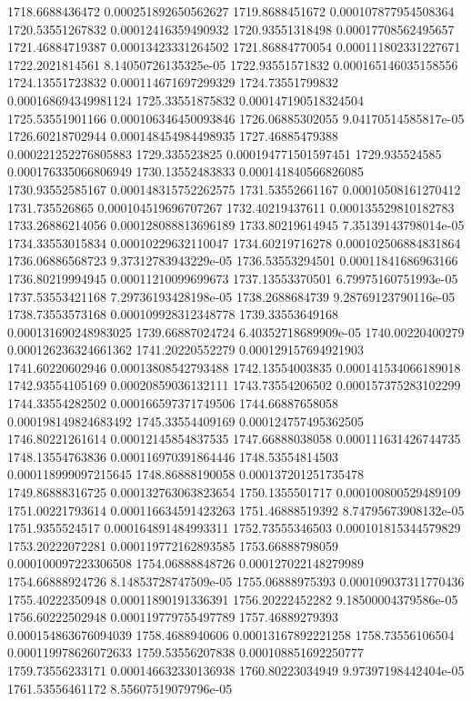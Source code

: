 {1718.6688436472 0.000251892650562627
1719.8688451672 0.000107877954508364
1720.53551267832 0.00012416359490932
1720.93551318498 0.00017708562495657
1721.46884719387 0.00013423331264502
1721.86884770054 0.000111802331227671
1722.2021814561 8.14050726135325e-05
1722.93551571832 0.000165146035158556
1724.13551723832 0.000114671697299329
1724.73551799832 0.000168694349981124
1725.33551875832 0.000147190518324504
1725.53551901166 0.000106346450093846
1726.06885302055 9.04170514585817e-05
1726.60218702944 0.000148454984498935
1727.46885479388 0.000221252276805883
1729.335523825 0.000194771501597451
1729.935524585 0.000176335066806949
1730.13552483833 0.000141840566826085
1730.93552585167 0.000148315752262575
1731.53552661167 0.00010508161270412
1731.735526865 0.000104519696707267
1732.40219437611 0.000135529810182783
1733.26886214056 0.000128088813696189
1733.80219614945 7.35139143798014e-05
1734.33553015834 0.00010229632110047
1734.60219716278 0.000102506884831864
1736.06886568723 9.37312783943229e-05
1736.53553294501 0.00011841686963166
1736.80219994945 0.00011210099699673
1737.13553370501 6.79975160751993e-05
1737.53553421168 7.29736193428198e-05
1738.2688684739 9.28769123790116e-05
1738.73553573168 0.000109928312348778
1739.33553649168 0.000131690248983025
1739.66887024724 6.40352718689909e-05
1740.00220400279 0.000126236324661362
1741.20220552279 0.000129157694921903
1741.60220602946 0.00013808542793488
1742.13554003835 0.000141534066189018
1742.93554105169 0.00020859036132111
1743.73554206502 0.000157375283102299
1744.33554282502 0.000166597371749506
1744.66887658058 0.000198149824683492
1745.33554409169 0.000124757495362505
1746.80221261614 0.00012145854837535
1747.66888038058 0.000111631426744735
1748.13554763836 0.000116970391864446
1748.53554814503 0.000118999097215645
1748.86888190058 0.000137201251735478
1749.86888316725 0.000132763063823654
1750.1355501717 0.000100800529489109
1751.00221793614 0.000116634591423263
1751.46888519392 8.74795673908132e-05
1751.9355524517 0.000164891484993311
1752.73555346503 0.000101815344579829
1753.20222072281 0.000119772162893585
1753.66888798059 0.000100097223306508
1754.06888848726 0.000127022148279989
1754.66888924726 8.14853728747509e-05
1755.06888975393 0.000109037311770436
1755.40222350948 0.00011890191336391
1756.20222452282 9.18500004379586e-05
1756.60222502948 0.000119779755497789
1757.46889279393 0.000154863676094039
1758.4688940606 0.00013167892221258
1758.73556106504 0.000119978626072633
1759.53556207838 0.000108851692250777
1759.73556233171 0.000146632330136938
1760.80223034949 9.97397198442404e-05
1761.53556461172 8.55607519079796e-05
}
